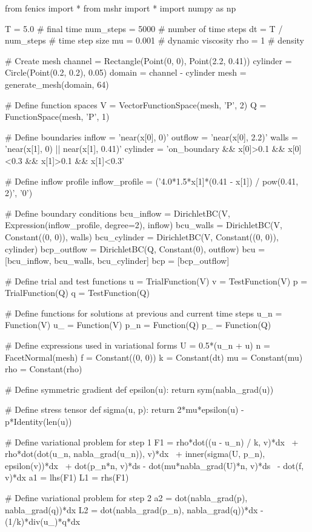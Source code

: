 \begin{python}
from fenics import *
from mshr import *
import numpy as np

T = 5.0            # final time
num_steps = 5000   # number of time steps
dt = T / num_steps # time step size
mu = 0.001         # dynamic viscosity
rho = 1            # density

# Create mesh
channel = Rectangle(Point(0, 0), Point(2.2, 0.41))
cylinder = Circle(Point(0.2, 0.2), 0.05)
domain = channel - cylinder
mesh = generate_mesh(domain, 64)

# Define function spaces
V = VectorFunctionSpace(mesh, 'P', 2)
Q = FunctionSpace(mesh, 'P', 1)

# Define boundaries
inflow   = 'near(x[0], 0)'
outflow  = 'near(x[0], 2.2)'
walls    = 'near(x[1], 0) || near(x[1], 0.41)'
cylinder = 'on_boundary && x[0]>0.1 && x[0]<0.3 && x[1]>0.1 && x[1]<0.3'

# Define inflow profile
inflow_profile = ('4.0*1.5*x[1]*(0.41 - x[1]) / pow(0.41, 2)', '0')

# Define boundary conditions
bcu_inflow = DirichletBC(V, Expression(inflow_profile, degree=2), inflow)
bcu_walls = DirichletBC(V, Constant((0, 0)), walls)
bcu_cylinder = DirichletBC(V, Constant((0, 0)), cylinder)
bcp_outflow = DirichletBC(Q, Constant(0), outflow)
bcu = [bcu_inflow, bcu_walls, bcu_cylinder]
bcp = [bcp_outflow]

# Define trial and test functions
u = TrialFunction(V)
v = TestFunction(V)
p = TrialFunction(Q)
q = TestFunction(Q)

# Define functions for solutions at previous and current time steps
u_n = Function(V)
u_  = Function(V)
p_n = Function(Q)
p_  = Function(Q)

# Define expressions used in variational forms
U  = 0.5*(u_n + u)
n  = FacetNormal(mesh)
f  = Constant((0, 0))
k  = Constant(dt)
mu = Constant(mu)
rho = Constant(rho)

# Define symmetric gradient
def epsilon(u):
    return sym(nabla_grad(u))

# Define stress tensor
def sigma(u, p):
    return 2*mu*epsilon(u) - p*Identity(len(u))

# Define variational problem for step 1
F1 = rho*dot((u - u_n) / k, v)*dx \
   + rho*dot(dot(u_n, nabla_grad(u_n)), v)*dx \
   + inner(sigma(U, p_n), epsilon(v))*dx \
   + dot(p_n*n, v)*ds - dot(mu*nabla_grad(U)*n, v)*ds \
   - dot(f, v)*dx
a1 = lhs(F1)
L1 = rhs(F1)

# Define variational problem for step 2
a2 = dot(nabla_grad(p), nabla_grad(q))*dx
L2 = dot(nabla_grad(p_n), nabla_grad(q))*dx - (1/k)*div(u_)*q*dx


\end{python}

